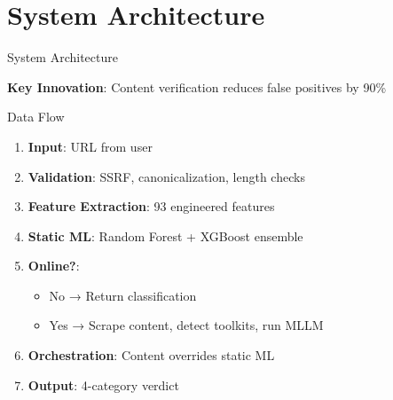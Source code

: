 \documentclass[10pt, aspectratio=169]{beamer}
\begin{document}
\section{System Architecture}

\begin{frame}{System Architecture}
    \begin{center}
    \end{center}
    \vspace{5mm}
    \textbf{Key Innovation}: Content verification reduces false positives by 90\%
\end{frame}

\begin{frame}{Data Flow}
    \begin{enumerate}
        \item \textbf{Input}: URL from user
        \item \textbf{Validation}: SSRF, canonicalization, length checks
        \item \textbf{Feature Extraction}: 93 engineered features
        \item \textbf{Static ML}: Random Forest + XGBoost ensemble
        \item \textbf{Online?}:
            \begin{itemize}
                \item No → Return classification
                \item Yes → Scrape content, detect toolkits, run MLLM
            \end{itemize}
        \item \textbf{Orchestration}: Content overrides static ML
        \item \textbf{Output}: 4-category verdict
    \end{enumerate}
\end{frame}
\end{document}
